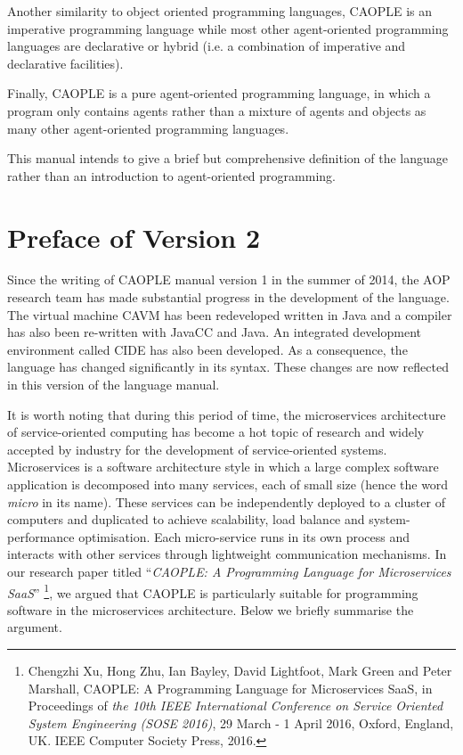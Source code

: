 \documentclass[english]{report}
\newcommand{\comment}[1]{
   \marginpar{
   \flushleft{
   \footnotesize{
   \textit{\color{red} 
   #1 
   }}}}}
\begin{document}
Another similarity to object oriented programming languages, CAOPLE is 
an imperative programming language while most other agent-oriented 
programming languages are declarative or hybrid (i.e. a combination of 
imperative and declarative facilities). 

Finally, CAOPLE is a pure agent-oriented programming language, in which 
a program only contains agents rather than a mixture of agents and 
objects as many other agent-oriented programming languages. 

This manual intends to give a brief but comprehensive definition of the language 
rather than an introduction to agent-oriented programming. 

\chapter*{Preface of Version 2}

Since the writing of CAOPLE manual version 1 in the summer of 2014, 
the AOP research team has made substantial progress in the development of the 
language. The virtual machine CAVM has been redeveloped written in Java and 
a compiler has also been re-written with JavaCC and Java. An integrated development 
environment called CIDE has also been developed. As a consequence, the language has 
changed significantly in its syntax. These changes are now reflected in this version of the
language manual. 

It is worth noting that during this period of time, the microservices architecture of service-oriented computing 
has become a hot topic of research and widely accepted by industry for the development of service-oriented systems. 
Microservices is a software architecture style in which a large complex software application is decomposed into many services, each of small size (hence the word \emph{micro} in its name). These services can be independently deployed to a cluster of computers and duplicated to achieve scalability, load balance and system-performance optimisation. Each micro-service runs in its own process and interacts with other services through lightweight communication mechanisms. In our research paper titled ``\emph{CAOPLE: A Programming Language for Microservices SaaS}'' \footnote{Chengzhi Xu, Hong Zhu, Ian Bayley, David Lightfoot, Mark Green and Peter Marshall, CAOPLE: A Programming Language for Microservices SaaS, in Proceedings of \emph{the 10th IEEE International Conference on Service Oriented System Engineering (SOSE 2016)}, 29 March - 1 April 2016, Oxford, England, UK.  IEEE Computer Society Press, 2016.}, we argued that CAOPLE is particularly suitable for programming software in the microservices architecture. Below we briefly summarise the argument. 
\end{document}
